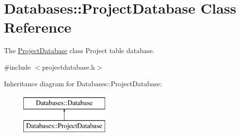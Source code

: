 \hypertarget{classDatabases_1_1ProjectDatabase}{}\section{Databases\+:\+:Project\+Database Class Reference}
\label{classDatabases_1_1ProjectDatabase}


The \hyperlink{classDatabases_1_1ProjectDatabase}{Project\+Database} class Project table database.  




{\ttfamily \#include $<$projectdatabase.\+h$>$}

Inheritance diagram for Databases\+:\+:Project\+Database\+:\begin{figure}[H]
\begin{center}
\leavevmode
\includegraphics[height=2.000000cm]{d7/d39/classDatabases_1_1ProjectDatabase}
\end{center}
\end{figure}
